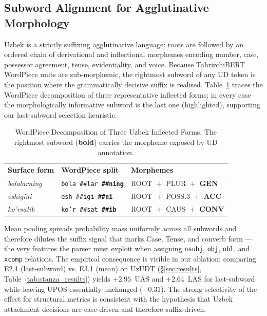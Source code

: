 \documentclass[10pt,conference,a4paper]{IEEEtran_EDM}
\begin{document}
\subsection{Subword Alignment for Agglutinative Morphology}
\label{sec:subword}

Uzbek is a strictly suffixing agglutinative language: roots are followed by an ordered chain of derivational and inflectional morphemes encoding number, case, possessor agreement, tense, evidentiality, and voice. Because TahrirchiBERT WordPiece units are sub-morphemic, the rightmost subword of any UD token is the position where the grammatically decisive suffix is realised. Table~\ref{tab:subword_examples} traces the WordPiece decomposition of three representative inflected forms; in every case the morphologically informative subword is the last one (highlighted), supporting our last-subword selection heuristic.

\begin{table}[htbp]
\caption{WordPiece Decomposition of Three Uzbek Inflected Forms. The rightmost subword (\textbf{bold}) carries the morpheme exposed by UD annotation.}
\begin{center}
\setlength{\tabcolsep}{4pt}
\begin{tabular}{lll}
\toprule
\textbf{Surface form} & \textbf{WordPiece split} & \textbf{Morphemes} \\
\midrule
\textit{bolalarning} & \texttt{bola \#\#lar }\textbf{\texttt{\#\#ning}} & ROOT $\!+\!$ PLUR $\!+\!$ \textbf{GEN} \\
\textit{eshigini} & \texttt{esh \#\#igi }\textbf{\texttt{\#\#ni}} & ROOT $\!+\!$ POSS.3 $\!+\!$ \textbf{ACC} \\
\textit{ko'rsatib} & \texttt{ko'r \#\#sat }\textbf{\texttt{\#\#ib}} & ROOT $\!+\!$ CAUS $\!+\!$ \textbf{CONV} \\
\bottomrule
\end{tabular}
\label{tab:subword_examples}
\end{center}
\end{table}

Mean pooling spreads probability mass uniformly across all subwords and therefore dilutes the suffix signal that marks Case, Tense, and converb form --- the very features the parser must exploit when assigning \texttt{nsubj}, \texttt{obj}, \texttt{obl}, and \texttt{xcomp} relations. The empirical consequence is visible in our ablation: comparing E2.1 (last-subword) vs. E3.1 (mean) on UzUDT (\S\ref{sec:results}, Table~\ref{tab:stanza_results}) yields $+2.95$~UAS and $+2.64$~LAS for last-subword while leaving UPOS essentially unchanged ($-0.31$). The strong selectivity of the effect for structural metrics is consistent with the hypothesis that Uzbek attachment decisions are case-driven and therefore suffix-driven.
\end{document}
